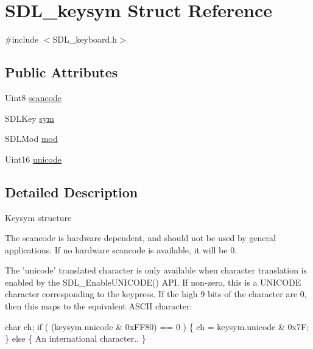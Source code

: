 \hypertarget{structSDL__keysym}{\section{S\+D\+L\+\_\+keysym Struct Reference}
\label{structSDL__keysym}
}


{\ttfamily \#include $<$S\+D\+L\+\_\+keyboard.\+h$>$}

\subsection*{Public Attributes}
\begin{DoxyCompactItemize}
\item 
Uint8 \hyperlink{structSDL__keysym_a1ea71b1de132939909302dc14e5f468c}{scancode}
\item 
S\+D\+L\+Key \hyperlink{structSDL__keysym_a2a22c7afc8239b19cd18dda3aa26b70c}{sym}
\item 
S\+D\+L\+Mod \hyperlink{structSDL__keysym_ac5da46a4cf8aea69b0b1cb3f9224c91c}{mod}
\item 
Uint16 \hyperlink{structSDL__keysym_a683a8e5de4e6dc6de95f670f6275cb0c}{unicode}
\end{DoxyCompactItemize}


\subsection{Detailed Description}
Keysym structure


\begin{DoxyItemize}
\item The scancode is hardware dependent, and should not be used by general applications. If no hardware scancode is available, it will be 0.
\item The 'unicode' translated character is only available when character translation is enabled by the S\+D\+L\+\_\+\+Enable\+U\+N\+I\+C\+O\+D\+E() A\+P\+I. If non-\/zero, this is a U\+N\+I\+C\+O\+D\+E character corresponding to the keypress. If the high 9 bits of the character are 0, then this maps to the equivalent A\+S\+C\+I\+I character\+: 
\begin{DoxyCode}
\textcolor{keywordtype}{char} ch;
\textcolor{keywordflow}{if} ( (keysym.unicode & 0xFF80) == 0 ) \{
    ch = keysym.unicode & 0x7F;
\} \textcolor{keywordflow}{else} \{
    An international character..
\}
\end{DoxyCode}
 
\end{DoxyItemize}

